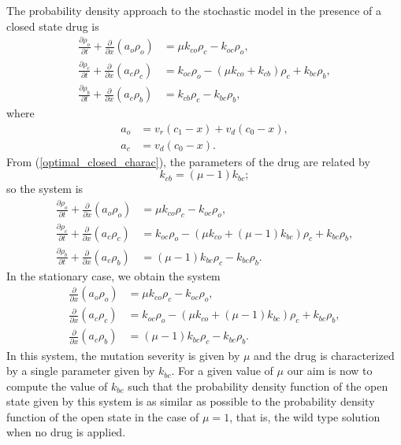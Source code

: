 The probability density approach to the stochastic model in the presence of a closed state drug is
\begin{align*}
\frac{\partial\rho_{o}}{\partial t}+\frac{\partial}{\partial x}\left(
a_{o}\rho_{o}\right)   &  =\mu k_{co}\rho_{c}-k_{oc}\rho_{o},\\
\frac{\partial\rho_{c}}{\partial t}+\frac{\partial}{\partial x}\left(
a_{c}\rho_{c}\right)   &  =k_{oc}\rho_{o}-\left(  \mu k_{co}+k_{cb}\right)
\rho_{c}+k_{bc}\rho_{b},\\
\frac{\partial\rho_{b}}{\partial t}+\frac{\partial}{\partial x}\left(
a_{c}\rho_{b}\right)   &  =k_{cb}\rho_{c}-k_{bc}\rho_{b},
\end{align*}
where 
\begin{align*}
a_{o} &  =v_{r}(c_{1}-x)+v_{d}(c_{0}-x),\\
a_{c} &  =v_{d}(c_{0}-x).
\end{align*}
From (\ref{optimal_closed_charac}), the parameters of the drug are related by%
\begin{equation}
k_{cb}=\left(  \mu-1\right)  k_{bc};  \label{kcb}
\end{equation}
so the system is%
\begin{align*}
\frac{\partial\rho_{o}}{\partial t}+\frac{\partial}{\partial x}\left(
a_{o}\rho_{o}\right)   &  =\mu k_{co}\rho_{c}-k_{oc}\rho_{o},\\
\frac{\partial\rho_{c}}{\partial t}+\frac{\partial}{\partial x}\left(
a_{c}\rho_{c}\right)   &  =k_{oc}\rho_{o}-\left(  \mu k_{co}+\left(
\mu-1\right)  k_{bc}\right)  \rho_{c}+k_{bc}\rho_{b},\\
\frac{\partial\rho_{b}}{\partial t}+\frac{\partial}{\partial x}\left(
a_{c}\rho_{b}\right)   &  =\left(  \mu-1\right)  k_{bc}\rho_{c}-k_{bc}\rho
_{b}.
\end{align*}
In the stationary case, we obtain the system%
\begin{align}
\frac{\partial}{\partial x}\left(  a_{o}\rho_{o}\right)   &  =\mu k_{co}%
\rho_{c}-k_{oc}\rho_{o}, \label{st1} \\
\frac{\partial}{\partial x}\left(  a_{c}\rho_{c}\right)   &  =k_{oc}\rho
_{o}-\left(  \mu k_{co}+\left(  \mu-1\right)  k_{bc}\right)  \rho_{c}%
+k_{bc}\rho_{b},  \label{st2}\\
\frac{\partial}{\partial x}\left(  a_{c}\rho_{b}\right)   &  =\left(
\mu-1\right)  k_{bc}\rho_{c}-k_{bc}\rho_{b}  \label{st3}.
\end{align}
In this system, the mutation severity is given by $\mu$ and the drug is characterized by a single parameter given by $k_{bc}$. For a given value of $\mu$ our aim is now to compute the value of $k_{bc}$ such that the probability density function of the open state given by this system is as similar as possible to the probability density function of the open state in the case of $\mu=1$, that is, the wild type solution when no drug is applied.



